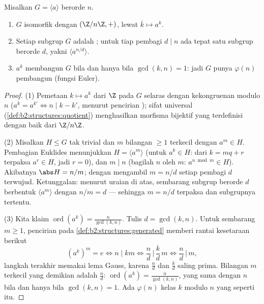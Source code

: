 \begin{proposition}\label{prop:b2:structures:cyclic}
Misalkan $G = \langle a \rangle$  berorde $n$.
\begin{enumerate}
  \item $G$ isomorfik dengan $(\Z/n\Z, +)$, lewat $\overline k \mapsto
        a^k$.
  \item Setiap subgrup $G$ adalah ; untuk tiap pembagi $d \mid n$
        ada tepat satu subgrup berorde $d$, yakni $\langle
        a^{n/d}\rangle$.
  \item $a^k$ membangun $G$ bila dan hanya bila $\gcd(k, n) = 1$: jadi
        $G$ punya $\varphi(n)$ pembangun (fungsi Euler).
\end{enumerate}
\end{proposition}

\begin{proof}
(1) Pemetaan $k \mapsto a^k$ dari $\Z$ pada $G$ selaras dengan
kekongruenan modulo $n$ ($a^{k} = a^{k'} \iff n \mid k - k'$, menurut
pencirian ); sifat universal
(\cref{def:b2:structures:quotient}) menghasilkan morfisma bijektif yang
terdefinisi dengan baik dari $\Z/n\Z$.

(2) Misalkan $H \leq G$ tak trivial dan $m$ bilangan $\geq 1$ terkecil
dengan $a^m \in H$. Pembagian Euklides menunjukkan $H = \langle
a^m\rangle$ (untuk $a^k \in H$: dari $k = mq + r$ terpaksa $a^r \in H$,
jadi $r = 0$), dan $m \mid n$ (bagilah $n$ oleh $m$: $a^{n \bmod m} \in
H$). Akibatnya $\abs H = n/m$; dengan mengambil $m = n/d$ setiap pembagi
$d$ terwujud. Ketunggalan: menurut uraian di atas, sembarang subgrup
berorde $d$ berbentuk $\langle a^m \rangle$ dengan $n/m = d$ ---
sehingga $m = n/d$ terpaksa dan subgrupnya tertentu.

(3) Kita klaim $\operatorname{ord}(a^k) = \frac{n}{\gcd(k, n)}$.
Tulis $d = \gcd(k, n)$. Untuk sembarang $m \geq 1$, pencirian  pada
\cref{def:b2:structures:generated} memberi rantai kesetaraan berikut
\[
(a^k)^m = e
\iff n \mid km
\iff \frac{n}{d} \,\Big|\, \frac{k}{d}\,m
\iff \frac{n}{d} \,\Big|\, m ,
\]
langkah terakhir memakai lema Gauss, karena $\frac nd$ dan $\frac kd$
saling prima. Bilangan $m$ terkecil yang demikian adalah $\frac nd$:
$\operatorname{ord}(a^k) = \frac n{\gcd(k,n)}$, yang sama dengan $n$
bila dan hanya bila $\gcd(k, n) = 1$. Ada $\varphi(n)$ kelas $k$
modulo $n$ yang seperti itu.
\end{proof}

